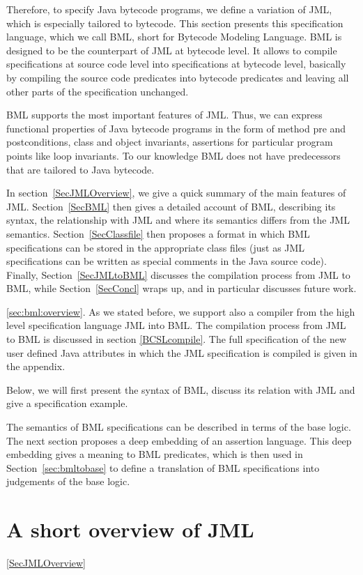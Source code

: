 \documentclass[a4paper]{llncs}
\begin{document}
Therefore, to specify Java bytecode programs, we define a variation
of JML, which is especially tailored to bytecode. This section
presents this specification language, which we call BML, short for
Bytecode Modeling Language. BML is designed to be the counterpart of
JML at bytecode level. It allows to compile specifications at source
code level into specifications at bytecode level, basically by
compiling the source code predicates into bytecode predicates and
leaving all other parts of the specification unchanged.

BML supports the most important features of JML. Thus, we can express
functional properties of Java bytecode programs in the form of method
pre and postconditions, class and object invariants, assertions for
particular program points like loop invariants. To our knowledge BML
does not have predecessors that are tailored to Java bytecode.

In section~\ref{SecJMLOverview}, we give a quick summary of the main
features of JML. Section~\ref{SecBML} then gives a detailed
account of BML, describing its syntax, the relationship with JML and where
its semantics differs from the JML
semantics. Section~\ref{SecClassfile} then proposes a
format in which BML specifications can be stored in the appropriate
class files (just as JML specifications can be written as special
comments in the Java source code). Finally, Section~\ref{SecJMLtoBML}
discusses the compilation process from JML to BML, while
Section~\ref{SecConcl} wraps up, and in particular discusses future
work.


\ref{sec:bml:overview}.  As we stated before, we support also a compiler
from the high level specification language JML into BML. The
compilation process from JML to BML is discussed in section
\ref{BCSLcompile}.  The full specification of the new user defined
Java attributes in which the JML specification is compiled is given in
the appendix.

Below, we will first present the syntax of BML, discuss its relation
with JML and give a specification example. 

The semantics of BML specifications can be described in terms of the
\mobius base logic. The next section proposes a
deep embedding of an assertion language. This deep embedding gives a
meaning to BML predicates, which is then used in
Section~\ref{sec:bmltobase} to define a translation
of BML specifications into judgements of the \mobius base logic.

\section{A short overview of JML}\ref{SecJMLOverview}
\end{document}
